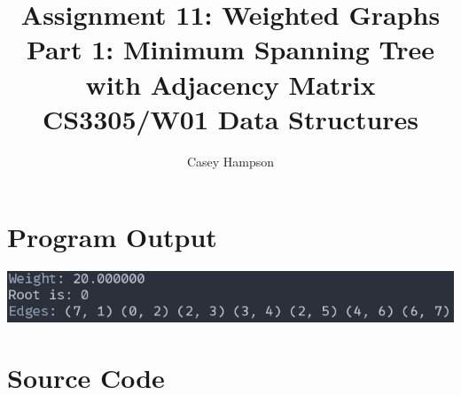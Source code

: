\documentclass{article}
\title{Assignment 11: Weighted Graphs \\[5pt] Part 1: Minimum Spanning Tree with Adjacency Matrix \\[8pt] CS3305/W01 Data Structures}
\author{Casey Hampson}
\begin{document}
\maketitle


\section*{Program Output}
\begin{center}
  \includegraphics[width=0.8\linewidth]{./res/1.png}
\end{center}


\pagebreak
\section*{Source Code}
\inputminted{java}{./P1.java} 
\end{document}
